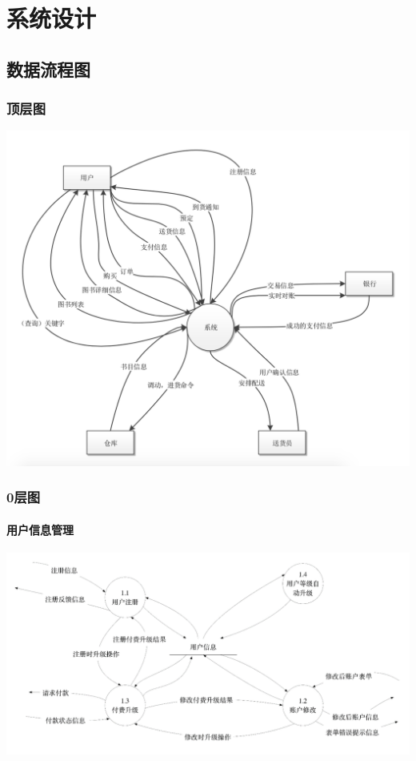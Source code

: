 \chapter{系统设计}
\section{数据流程图}
\subsection{顶层图}
\includegraphics{img/0.png}
\subsection{0层图}
\subsubsection{用户信息管理}
\includegraphics{img/1.png}
